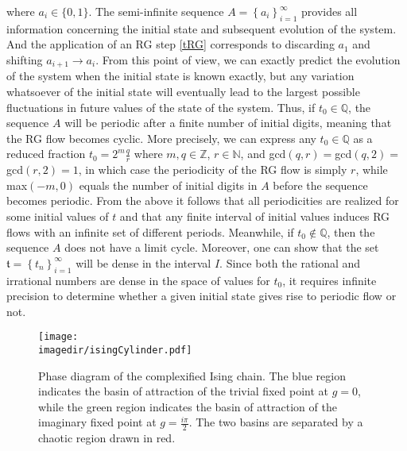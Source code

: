 where $a_i \in \{0,1\}$. The semi-infinite sequence $A=\left\{a_i\right\}^\infty_{i=1}$ provides all information concerning the initial state and subsequent evolution of the system. And the application of an RG step \cref{tRG} corresponds to discarding $a_1$ and shifting $a_{i+1} \to a_{i}$. From this point of view, we can exactly predict the evolution of the system when the initial state is known exactly, but any variation whatsoever of the initial state will eventually lead to the largest possible fluctuations in future values of the state of the system. Thus, if $t_0 \in \mathbb{Q}$, the sequence $A$ will be periodic after a finite number of initial digits, meaning that the RG flow becomes cyclic. More precisely, we can express any $t_0 \in \mathbb{Q}$ as a reduced fraction $t_0 = 2^m\frac{q}{r}$ where $m,q\in \mathbb{Z}$, $r\in\mathbb{N}$, and gcd$(q,r)=$gcd$(q,2)=$gcd$(r,2)=1$, in which case the periodicity of the RG flow is simply $r$, while max$(-m,0)$ equals the number of initial digits in $A$ before the sequence becomes periodic. From the above it follows that all periodicities are realized for some initial values of $t$ and that any finite interval of initial values induces RG flows with an infinite set of different periods. Meanwhile, if $t_0 \notin \mathbb{Q}$, then the sequence $A$ does not have a limit cycle. Moreover, one can show that the set $\mathfrak{t}=\left\{t_n\right\}^\infty_{i=1}$ will be dense in the interval $I$.  Since both the rational and irrational numbers are dense in the space of values for $t_0$, it requires infinite precision to determine whether a given initial state gives rise to periodic flow or not. 

\begin{figure}
    \centering
    \texttt{[image: \\imagedir/isingCylinder.pdf]}
    \caption{Phase diagram of the complexified Ising chain. The blue region indicates the basin of attraction of the trivial fixed point at $g=0$, while the green region indicates the basin of attraction of the imaginary fixed point at $g=\frac{i\pi}{2}$. The two basins are separated by a chaotic region drawn in red.}
    \label{fig:Ising}
\end{figure}

